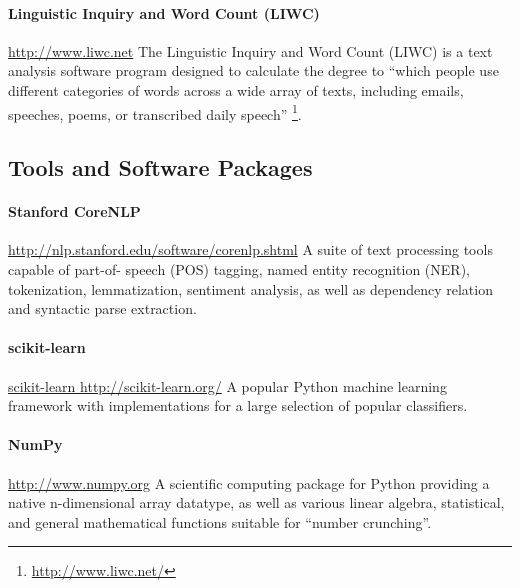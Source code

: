 \documentclass[
10pt, %
a4paper, %
oneside, %
headinclude,footinclude, %
BCOR5mm, %
]{scrartcl}
\begin{document}
\paragraph{\textbf{Linguistic Inquiry and Word Count (LIWC)}}
\hfill \newline \noindent \url{http://www.liwc.net}
\hfill \newline \noindent The Linguistic Inquiry and Word Count (LIWC) is a text
analysis software program designed to calculate the degree to ``which people use 
different categories of words across a wide array of texts, including emails, 
speeches, poems, or transcribed daily speech''
\footnote{\url{http://www.liwc.net/}}.

\subsection{Tools and Software Packages}

\paragraph{\textbf{Stanford CoreNLP}}
\hfill \newline \noindent \url{http://nlp.stanford.edu/software/corenlp.shtml}
\hfill \newline \noindent A suite of text processing tools capable of part-of-
speech (POS) tagging, named entity recognition (NER), tokenization,
lemmatization, sentiment analysis, as well as dependency relation and 
syntactic parse extraction.

\paragraph{\textbf{scikit-learn}}
\hfill \newline \noindent \url{scikit-learn http://scikit-learn.org/}
\hfill \newline \noindent A popular Python machine learning framework with
implementations for a large selection of popular classifiers.

\paragraph{\textbf{NumPy}}
\hfill \newline \noindent \url{http://www.numpy.org}
\hfill \newline \noindent A scientific computing package for Python providing a
native n-dimensional array datatype, as well as various linear algebra,
statistical, and general mathematical functions suitable for ``number
crunching''.
\end{document}
